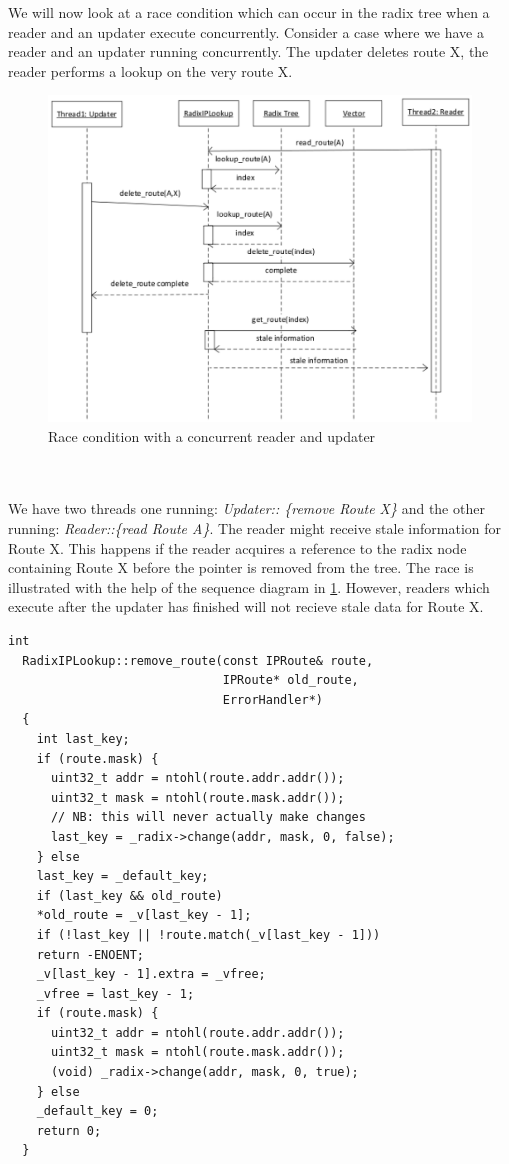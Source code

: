 \documentclass[a4paper,marginparwidth=50pt,marginparsep=10pt]{article}
\begin{document}
We will now look at a race condition which can occur in the radix tree when a reader and an updater execute concurrently. Consider a case where we have a reader and an updater running concurrently. The updater deletes route X, the reader performs a lookup on the very route X.
\begin{figure}[tph]
\begin{center}
\includegraphics[scale=0.6]{../images/diagrams/race1eps.eps}
\end{center}
\caption{Race condition with a concurrent reader and updater}
\label{race1figure}
\end{figure}
\\\\
We have two threads one running: \emph{Updater:: \{remove Route X\}} and the other running: \emph{Reader::\{read Route A\}}. The reader might receive stale information for Route X. This happens if the reader acquires a reference to the radix node containing Route X before the pointer is removed from the tree. The race is illustrated with the help of the sequence diagram in \ref{race1figure}. However, readers which execute after the updater has finished will not recieve stale data for Route X.
\begin{lstlisting}[caption= The remove\_route() function, label=removeroute,float=tph]
  int
  RadixIPLookup::remove_route(const IPRoute& route, 
                              IPRoute* old_route, 
                              ErrorHandler*)
  {
    int last_key;
    if (route.mask) {
      uint32_t addr = ntohl(route.addr.addr());
      uint32_t mask = ntohl(route.mask.addr());
      // NB: this will never actually make changes
      last_key = _radix->change(addr, mask, 0, false);
    } else
    last_key = _default_key;
    if (last_key && old_route)
    *old_route = _v[last_key - 1];
    if (!last_key || !route.match(_v[last_key - 1]))
    return -ENOENT;
    _v[last_key - 1].extra = _vfree;
    _vfree = last_key - 1;
    if (route.mask) {
      uint32_t addr = ntohl(route.addr.addr());
      uint32_t mask = ntohl(route.mask.addr());
      (void) _radix->change(addr, mask, 0, true);
    } else
    _default_key = 0;
    return 0;
  }
\end{lstlisting}
\end{document}
